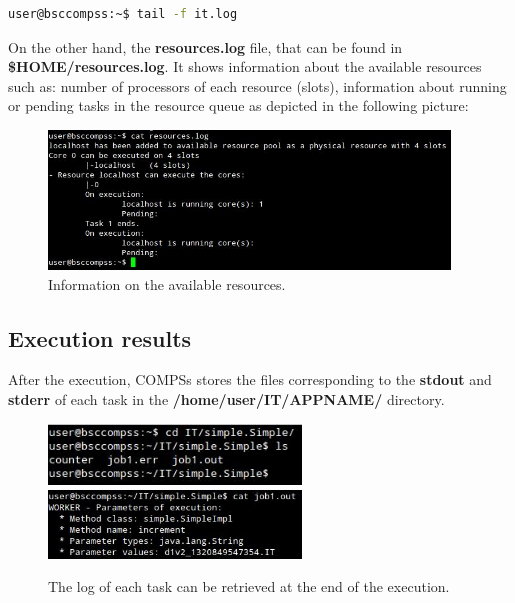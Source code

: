 \begin{lstlisting}[language=bash]
user@bsccompss:~$ tail -f it.log
\end{lstlisting}

On the other hand, the {\bf resources.log} file, that can be found in {\bf \$HOME/resources.log}. It shows information 
about the available resources such as: number of processors of each resource (slots), information about running or 
pending tasks in the resource queue as depicted in the following picture:

\begin{figure}[h!]
  \centering
    \includegraphics[width=0.95\textwidth]{./Sections/3_Running_Apps/Figures/available_resources.jpeg}
    \caption{Information on the available resources. \label{fig:available_resources}}
\end{figure}


\subsection{Execution results}
After the execution, COMPSs stores the files corresponding to the {\bf stdout} and {\bf stderr} of each task in the 
{\bf /home/user/IT/APPNAME/} directory.

\begin{figure}[h!]
  \centering
    \includegraphics[width=0.6\textwidth]{./Sections/3_Running_Apps/Figures/task_log1.jpeg}
    \includegraphics[width=0.6\textwidth]{./Sections/3_Running_Apps/Figures/task_log2.jpeg}
    \caption{The log of each task can be retrieved at the end of the execution. \label{fig:task_logs}}
\end{figure}

